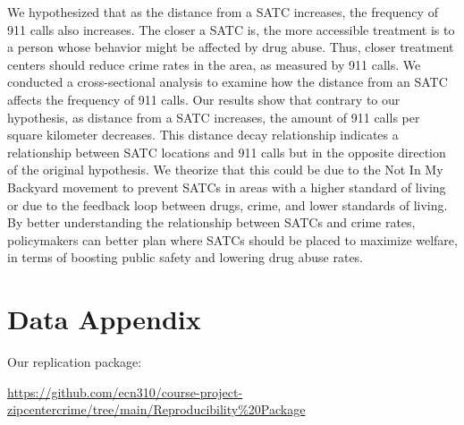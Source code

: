 \documentclass[12pt]{article}
\begin{document}
We hypothesized that as the distance from a SATC increases, the frequency of 911 calls also increases. The closer a SATC is, the more accessible treatment is to a person whose behavior might be affected by drug abuse. Thus, closer treatment centers should reduce crime rates in the area, as measured by 911 calls. We conducted a cross-sectional analysis to examine how the distance from an SATC affects the frequency of 911 calls. Our results show that contrary to our hypothesis, as distance from a SATC increases, the amount of 911 calls per square kilometer decreases. This distance decay relationship indicates a relationship between SATC locations and 911 calls but in the opposite direction of the original hypothesis. We theorize that this could be due to the Not In My Backyard movement to prevent SATCs in areas with a higher standard of living or due to the feedback loop between drugs, crime, and lower standards of living. By better understanding the relationship between SATCs and crime rates, policymakers can better plan where SATCs should be placed to maximize welfare, in terms of boosting public safety and lowering drug abuse rates. 


 

\newpage
\singlespacing
\setlength\bibsep{0pt}





\newpage
\section*{Data Appendix} \label{sec:appendixa}

Our replication package:

\href{https://github.com/ecn310/course-project-zipcentercrime/tree/main/Reproducibility%20Package}{https://github.com/ecn310/course-project-zipcentercrime/tree/main/Reproducibility\%20Package}

\vspace{10pt}

\end{document}

